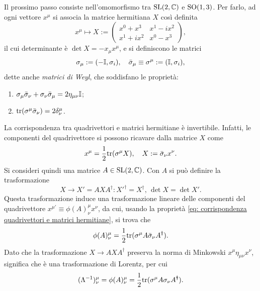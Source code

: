Il prossimo passo consiste nell'omomorfismo tra $\mathrm{SL}(2,\mathbb{C})$ e $\mathrm{SO}(1,3)$. Per farlo, ad ogni vettore $x^\mu$ si associa la matrice hermitiana $X$ così definita
\begin{equation}
    x^\mu \mapsto X := 
    \begin{pmatrix}
        x^0 + x^3 & x^1 - ix^2 \\
        x^1 + ix^2 & x^0 - x^3
    \end{pmatrix},
\end{equation}
il cui determinante è $\det{X} = -x_\mu x^\mu$, e si definiscono le matrici
\begin{equation}
\label{eq: matrici di Weyl}
    \sigma_\mu := (-\mathbb{I},\sigma_i),\quad \bar{\sigma}_\mu \equiv \sigma^\mu := (\mathbb{I},\sigma_i),
\end{equation}
dette anche \emph{matrici di Weyl}, che soddisfano le proprietà:
\begin{enumerate}
    \item $\sigma_\mu\bar{\sigma}_\nu + \sigma_\nu\bar{\sigma}_\mu = 2\eta_{\mu\nu}\mathbb{I}$;
    \item $\mathrm{tr}{(\sigma^\mu\bar{\sigma}_\nu)} = 2\delta^\mu_\nu$.
\end{enumerate}
La corrispondenza tra quadrivettori e matrici hermitiane è invertibile. Infatti, le componenti del quadrivettore si possono ricavare dalla matrice $X$ come 
\begin{equation}
\label{eq: corrispondenza quadrivettori e matrici hermitiane}
    x^\mu = \frac{1}{2}\mathrm{tr}{(\sigma^\mu X)},\quad X := \bar{\sigma}_\nu x^\nu.
\end{equation}
Si consideri quindi una matrice $A \in \mathrm{SL}(2,\mathbb{C})$. Con $A$ si può definire la trasformazione 
\begin{equation}
    X \to X' = AXA^\dag : X'^\dag = X^\dag,\,\det{X} = \det{X'}.
\end{equation}
Questa trasformazione induce una trasformazione lineare delle componenti del quadrivettore $x^{\mu\prime} \equiv \phi(A)^\mu_\nu x^\nu$, da cui, usando la proprietà \eqref{eq: corrispondenza quadrivettori e matrici hermitiane}, si trova che 
\begin{equation}
    \phi(A)^\mu_\nu = \frac{1}{2}\mathrm{tr}{(\sigma^\mu A\bar{\sigma}_\nu A^\dag)}.
\end{equation}
Dato che la trasformazione $X \to AXA^\dag$ preserva la norma di Minkowski $x^\mu \eta_{\mu\nu} x^\nu$, significa che è una trasformazione di Lorentz, per cui 
\begin{eqnarray}
\label{eq: omomorfismo tra SL(2,C) e SO(1,3)}
    (\Lambda^{-1})^\mu_\nu = \phi(A)^\mu_\nu = \frac{1}{2}\mathrm{tr}{(\sigma^\mu A\mathbb{\sigma}_\nu A^\dag)}.
\end{eqnarray} 
